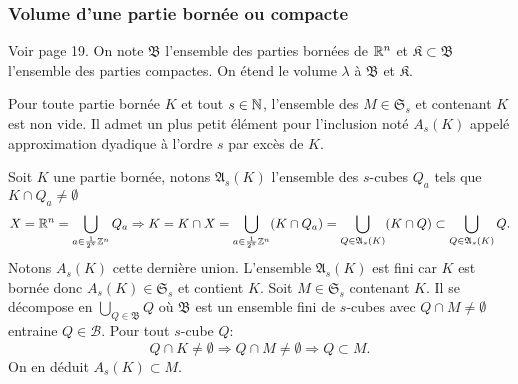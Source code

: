 \subsubsection{Volume d'une partie bornée ou compacte}
\noindent Voir page 19. On note $\mathfrak{B}$ l'ensemble des parties bornées  de $\mathbb{R}^n$ et $\mathfrak{K} \subset \mathfrak{B}$ l'ensemble des parties compactes. On étend le volume $\lambda$ à $\mathfrak{B}$ et $\mathfrak{K}$.
\begin{defi}
  Pour toute partie bornée $K$ et tout $s\in \mathbb{N}$, l'ensemble des $M\in \mathfrak{S}_s$ et contenant $K$ est non vide. Il admet un plus petit élément pour l'inclusion noté $A_s(K)$ appelé approximation dyadique à l'ordre $s$ par excès de $K$.
\end{defi}
\begin{demo}
Soit $K$  une partie bornée, notons $\mathfrak{A}_s(K)$ l'ensemble des $s$-cubes $Q_a$ tels que $K \cap Q_a \neq \emptyset$
\begin{displaymath}
 X = \mathbb{R}^n = \bigcup_{a\in \frac{1}{2^s}\mathbb{Z}^n}Q_a \Rightarrow K = K\cap X = \bigcup_{a\in \frac{1}{2^s}\mathbb{Z}^n}(K\cap Q_a)
   = \bigcup_{Q \in \mathfrak{A}_s(K)}(K \cap Q)
   \subset \bigcup_{Q \in \mathfrak{A}_s(K)} Q.
\end{displaymath}
Notons $A_s(K)$ cette dernière union. L'ensemble $\mathfrak{A}_s(K)$ est fini car $K$ est bornée donc $A_s(K)\in \mathfrak{S}_s$ et contient $K$.\newline
Soit $M  \in \mathfrak{S}_s$ contenant $K$. Il se décompose en $\bigcup_{Q \in \mathfrak{B}} Q$ où $\mathfrak{B}$ est un ensemble fini de $s$-cubes avec $Q \cap M \neq \emptyset$ entraine $Q \in \mathcal{B}$. Pour tout $s$-cube $Q$:
\begin{displaymath}
  Q \cap K \neq \emptyset \Rightarrow Q \cap M \neq \emptyset \Rightarrow Q \subset M.
\end{displaymath}
On en déduit $A_s(K) \subset M$.
\end{demo}

